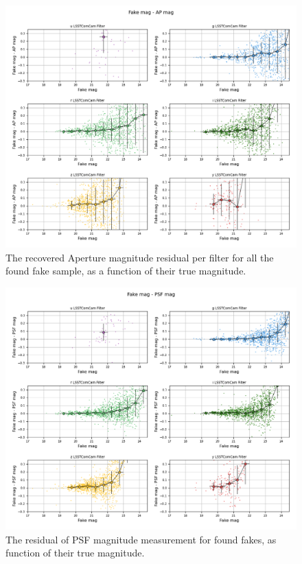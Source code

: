 \begin{figure}
    \centering
    \includegraphics[width=0.95\linewidth]{dia/figures/scatter_mag_ap_mag_perfilter.png}
    \caption{The recovered Aperture magnitude residual per filter for all the found fake sample, as a function of their true magnitude. }
    \label{fig:photometric_recovery_vs_fakemag}
\end{figure}
\begin{figure}
    \centering
    \includegraphics[width=0.95\linewidth]{dia/figures/scatter_mag_psf_mag_perfilter.png}
    \caption{The residual of PSF magnitude measurement for found fakes, as function of their true magnitude.}
    \label{fig:photometric_recovery_psf_vs_fakemag}
\end{figure}
